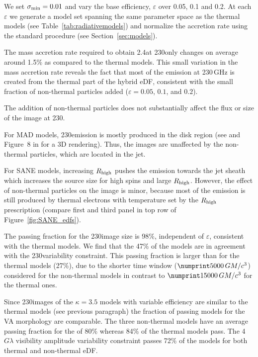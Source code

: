 We set $\sigma_{\rm min}=0.01$ and vary the base efficiency, $\varepsilon$ over 0.05, 0.1 and 0.2.
At each $\varepsilon$ we generate a model set spanning the same parameter space as the thermal models (see Table~\ref{tab:radiativemodels}) and normalize the accretion rate using the standard procedure (see Section~\ref{sec:models}).

The mass accretion rate required to obtain 2.4\Jy at 230\GHz only changes on average around 1.5\% as compared to the thermal models.
This small variation in the mass accretion rate reveals the fact that most of the emission at 230\,GHz is created from the thermal part of the hybrid eDF, consistent with the small fraction of non-thermal particles added ($\varepsilon=0.05$, $0.1$, and $0.2$).

\label{varkappa230}

The addition of non-thermal particles does not substantially affect the flux or size of the image at 230\GHz.

For MAD models, 230\GHz emission is mostly produced in the disk region (see  and Figure~8 in \citealt{Wong_2022} for a 3D rendering).
Thus, the images are unaffected by the non-thermal particles, which are located in the jet.

For SANE models, increasing $R_\mathrm{high}$ pushes the emission towards the jet sheath which increases the source size for high spins and large $R_\mathrm{high}$.
However, the effect of non-thermal particles on the image is minor, because most of the emission is still produced by thermal electrons with temperature set by the $R_\mathrm{high}$ prescription (compare first and third panel in top row of Figure~\ref{fig:SANE_edfs}).

The passing fraction for the 230\GHz image size is 98\%, independent of $\varepsilon$, consistent with the thermal models.
We find that the 47\% of the models are in agreement with the 230\GHz variability constraint.
This passing fraction is larger than for the thermal models (27\%), due to the shorter time window ($\no{5000}\,\tg$) considered for the non-thermal models in contrast to $\no{15000}\,\tg$ for the thermal ones.


Since 230\GHz images of the $\kappa=3.5$ models with variable efficiency are similar to the thermal models (see previous paragraph) the fraction of passing models for the VA morphology are comparable.
The three non-thermal models have an average passing fraction for the \vam of 80\% whereas 84\% of the thermal models pass.
The 4\,$G\lambda$ visibility amplitude variability constraint passes 72\% of the models for both thermal and non-thermal eDF.

